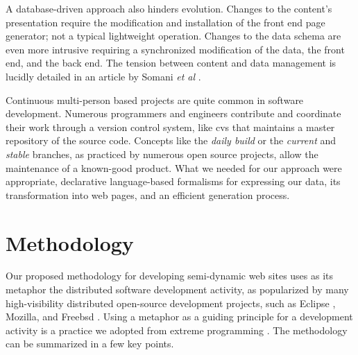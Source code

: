 \documentclass{elsart}
\begin{document}
A database-driven approach also hinders evolution.
Changes to the content's presentation require the modification
and installation of the front end page generator;
not a typical lightweight operation.
Changes to the data schema are even more intrusive
requiring a synchronized modification of the data,
the front end, and the back end.
The tension between content and data management is lucidly
detailed in an article by Somani {\em et al} \cite{SCK02}.

Continuous multi-person based projects are quite
common in software development.
Numerous programmers and engineers contribute and coordinate their work
through a version control system, like {\sc cvs} \cite{BF01} that
maintains a master repository of the source code.
Concepts like the \textit{daily build} \cite{KAL00} or the
\textit{current} and \textit{stable} branches, as practiced by
numerous open source projects, allow the maintenance
of a known-good product.
What we needed for our approach were appropriate,
declarative language-based formalisms for expressing our data,
its transformation into web pages, and an efficient
generation process.

\section{Methodology}
\label{sec:meth}
Our proposed methodology for developing semi-dynamic web sites uses as
its metaphor the distributed software development activity, as popularized
by many high-visibility distributed open-source development projects,
such as Eclipse \cite{GB04}, Mozilla, and Free{\sc bsd} \cite{Jor01}.
Using a metaphor as a guiding principle for a development activity
is a practice we adopted from extreme programming \cite{Bec00}.
The methodology can be summarized in a few key points.
\end{document}
